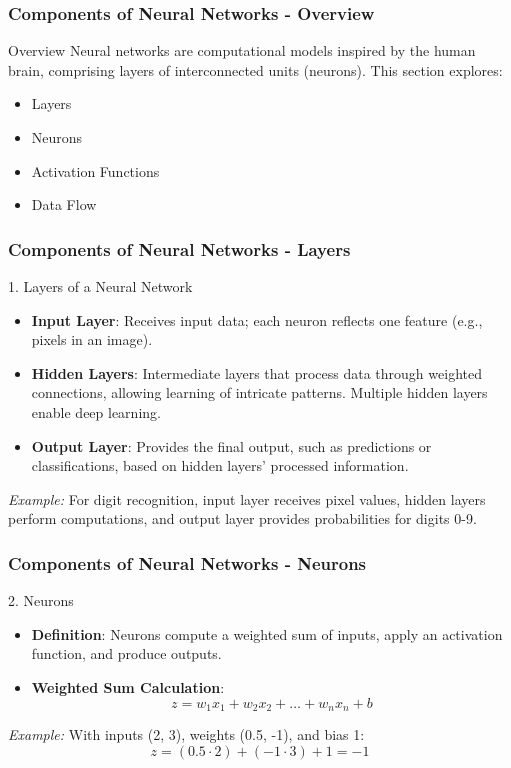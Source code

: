 \documentclass[aspectratio=169]{beamer}
\begin{document}
\begin{frame}[fragile]
    \frametitle{Components of Neural Networks - Overview}
    \begin{block}{Overview}
        Neural networks are computational models inspired by the human brain, comprising layers of interconnected units (neurons). This section explores:
        \begin{itemize}
            \item Layers
            \item Neurons
            \item Activation Functions
            \item Data Flow
        \end{itemize}
    \end{block}
\end{frame}

\begin{frame}[fragile]
    \frametitle{Components of Neural Networks - Layers}
    \begin{block}{1. Layers of a Neural Network}
        \begin{itemize}
            \item \textbf{Input Layer}: Receives input data; each neuron reflects one feature (e.g., pixels in an image).
            \item \textbf{Hidden Layers}: Intermediate layers that process data through weighted connections, allowing learning of intricate patterns. Multiple hidden layers enable deep learning.
            \item \textbf{Output Layer}: Provides the final output, such as predictions or classifications, based on hidden layers' processed information.
        \end{itemize}
        \textit{Example:} For digit recognition, input layer receives pixel values, hidden layers perform computations, and output layer provides probabilities for digits 0-9.
    \end{block}
\end{frame}

\begin{frame}[fragile]
    \frametitle{Components of Neural Networks - Neurons}
    \begin{block}{2. Neurons}
        \begin{itemize}
            \item \textbf{Definition}: Neurons compute a weighted sum of inputs, apply an activation function, and produce outputs.
            \item \textbf{Weighted Sum Calculation}:
            \begin{equation}
            z = w_1x_1 + w_2x_2 + \ldots + w_nx_n + b
            \end{equation}
            \end{itemize}
            \textit{Example:}
            With inputs (2, 3), weights (0.5, -1), and bias 1:
            \begin{equation}
            z = (0.5 \cdot 2) + (-1 \cdot 3) + 1 = -1
            \end{equation}
    \end{block}
\end{frame}
\end{document}
